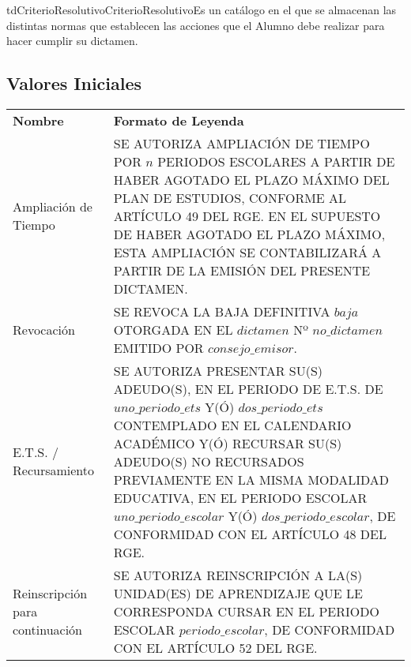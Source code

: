    
   \begin{TipoDeDato}{tdCriterioResolutivo}{CriterioResolutivo}{Es un catálogo en el que se almacenan las distintas normas que establecen las acciones que el Alumno debe realizar para hacer cumplir su dictamen. }
  
   	\begin{tdAtributos}
   		
   	\end{tdAtributos}
   
   	\subsection{Valores Iniciales}
   	
   	\begin{longtable}{|p{}|p{}|}
	\rowcolor{colorPrincipal}
	\multicolumn{2}{c}{\bf \color{white} Valores Iniciales}\\
	\hline
	\rowcolor{colorSecundario}
	\bf\color{white} Nombre & \bf\color{white}Formato de Leyenda\\
	\hline
   	Ampliación de Tiempo & SE AUTORIZA AMPLIACIÓN DE TIEMPO POR $n$ PERIODOS ESCOLARES A PARTIR DE HABER AGOTADO EL PLAZO MÁXIMO DEL PLAN DE ESTUDIOS, CONFORME AL ARTÍCULO 49 DEL RGE.  EN EL SUPUESTO DE HABER AGOTADO EL PLAZO MÁXIMO, ESTA AMPLIACIÓN SE CONTABILIZARÁ A PARTIR DE LA EMISIÓN DEL PRESENTE DICTAMEN.\\
	\hline
	Revocación & SE REVOCA LA BAJA DEFINITIVA  $baja$ OTORGADA EN EL $dictamen$ Nº $no\_dictamen$ EMITIDO POR  $consejo\_emisor$.\\
	\hline
	E.T.S. / Recursamiento &  SE AUTORIZA PRESENTAR SU(S) ADEUDO(S), EN EL PERIODO DE E.T.S. DE $uno\_periodo\_ets$  Y(Ó) $dos\_periodo\_ets$ CONTEMPLADO EN EL CALENDARIO ACADÉMICO  Y(Ó) RECURSAR SU(S) ADEUDO(S) NO RECURSADOS PREVIAMENTE EN LA MISMA MODALIDAD EDUCATIVA, EN EL PERIODO ESCOLAR $uno\_periodo\_escolar$ Y(Ó) $dos\_periodo\_escolar$, DE CONFORMIDAD CON EL ARTÍCULO 48 DEL RGE.\\
	\hline
	Reinscripción para continuación & SE AUTORIZA REINSCRIPCIÓN A LA(S) UNIDAD(ES) DE APRENDIZAJE QUE LE CORRESPONDA CURSAR EN EL PERIODO ESCOLAR $periodo\_escolar$, DE CONFORMIDAD CON EL ARTÍCULO 52 DEL RGE.\\
	\hline
   	\end{longtable}
   
   \end{TipoDeDato}
